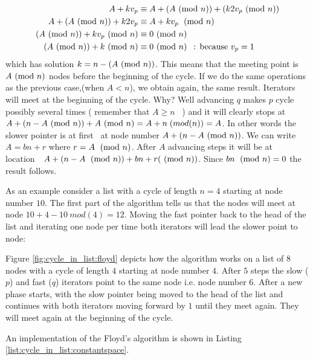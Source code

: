 \begin{align}
  A + kv_p &\equiv A + (A \ (\mathrm{mod}\ n)) + (k2v_p \ (\mathrm{mod}\ n)) \\
  A + (A \ (\mathrm{mod}\ n)) + k2v_p &\equiv A + kv_p\;\ (\mathrm{mod}\ n) \\
  (A \ (\mathrm{mod}\ n)) + kv_p \ (\mathrm{mod}\ n) & \equiv 0\ (\mathrm{mod}\ n) \\
  (A \ (\mathrm{mod}\ n)) + k \ (\mathrm{mod}\ n) &\equiv 0 \ (\mathrm{mod}\ n) \: \: \text{  : because  } v_p=1 \\
\end{align}
which has solution \(k = n-(A \ (\mathrm{mod}\ n))\). This means that the meeting point is \(A \ (\mathrm{mod}\ n)\) nodes
before the beginning of the cycle. If we do the same operations as the previous case,(when \(A <
n\)), we obtain again, the same result. Iterators will meet at the beginning of the cycle. Why? Well
advancing \(q\) makes \(p\) cycle possibly several times ( remember that \(A \geq n\)  ) and it will
clearly stops at \( A+(n-A \ (\mathrm{mod}\ n)) + A \ (\mathrm{mod}\ n) = A +n \;(mod (n))= A\).
In other words the slower pointer is at first  at node number \(A+(n-A \ (\mathrm{mod}\ n))\). We can write \( A
= bn + r\) where \(r = A \;\ (\mathrm{mod}\ n)\). After \(A\) advancing steps it will be at location  \( A+(n-A
\;\ (\mathrm{mod}\ n)) +bn +r (\ (\mathrm{mod}\ n))\). Since \(bn \; \ (\mathrm{mod}\ n)=0\) the result follows.

As an example consider a list with a cycle of length \(n=4\) starting at node number \(10\). The
first part of the algorithm tells us that the nodes will meet at node \(10 + 4 - 10 \: mod(4) =
12\). Moving the fast pointer back to the head of the list and iterating one node per time both
iterators will lead the slower point to node:


Figure \ref{fig:cycle_in_list:floyd} depicts how the algorithm
works on a list of $8$ nodes with a cycle of length $4$ starting at node number $4$. 
After $5$ steps the slow ($p$) and fast ($q$) iterators point to the same node i.e. node number $6$. 
After a new phase starts, with the slow pointer being moved to the head of the list and continues with both iterators moving forward by $1$
until they meet again. 
They will meet again at the beginning of the cycle. 

An implementation of the Floyd's algorithm is shown in Listing \ref{list:cycle_in_list:constantspace}.




